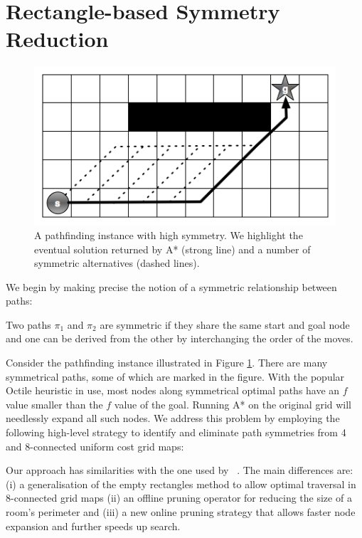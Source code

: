 \section{Rectangle-based Symmetry Reduction}
\label{rooms-based symmetry reduction}

\begin{figure}[]
       \begin{center}
                       \includegraphics[scale=0.36]{diagrams/symmetry_example.png}
       \end{center}
       \caption{A pathfinding instance with high symmetry. We highlight the
eventual solution returned by A* (strong line) and a number of symmetric 
alternatives (dashed lines).}
       \label{fig-symmetry}
		\vspace{-0.5em}
\end{figure}

We begin by making precise the notion of a symmetric relationship between paths:
\begin{definition}
Two paths $\pi_{1}$ and $\pi_{2}$ are symmetric if they share the same start and
goal node and one can be derived from the other by interchanging the order of the
moves.
\end{definition}

Consider the pathfinding instance illustrated in Figure \ref{fig-symmetry}.
There are many symmetrical paths, some of which are marked in the figure.  With
the popular Octile heuristic in use, most nodes along symmetrical optimal paths
have an $f$ value smaller than the $f$ value of the goal.  Running A* on the
original grid will needlessly expand all such nodes.  We address this problem by
employing the following high-level strategy to identify and eliminate path
symmetries from 4 and 8-connected uniform cost grid maps:


Our approach has similarities with the one used by
\citeauthor{harabor10}~.  The main differences are: (i) a
generalisation of the empty rectangles method to allow optimal traversal in
8-connected grid maps (ii) an offline pruning operator for reducing the size of
a room's perimeter and (iii) a new online pruning strategy that allows faster
node expansion and further speeds up search.

